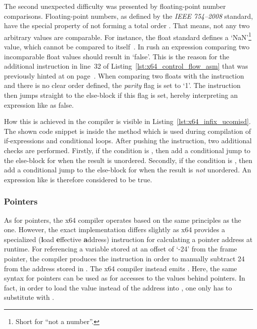 The second unexpected difficulty was presented by floating-point number comparisons.
Floating-point numbers, as defined by the \emph{IEEE 754--2008} standard, have the special property of not forming a total order .
That means, not any two arbitrary values are comparable.
For instance, the float standard defines a `NaN'\footnote{Short for ``not a number''.} value, which cannot be compared to itself~\cite[p.~216]{Patterson2017-zq}.
In rush an expression comparing two incomparable float values should result in `false'.
This is the reason for the additional  instruction in line~32 of Listing~\ref{lst:x64_control_flow_asm} that was previously hinted at on page~\pageref{x64_ucomisd}.
When comparing two floats with the  instruction and there is no clear order defined, the \emph{parity} flag is set to `1'.
The  instruction then jumps straight to the else-block if this flag is set, hereby interpreting an expression like  as false.


How this is achieved in the compiler is visible in Listing~\ref{lst:x64_infix_ucomisd}.
The shown code snippet is inside the  method which is used during compilation of if-expressions and conditional loops.
After pushing the  instruction, two additional checks are performed.
Firstly, if the condition is \qVerb{==}, then add a conditional jump to the else-block for when the result is unordered.
Secondly, if the condition is \qVerb{!=}, then add a conditional jump to the else-block for when the result is \emph{not} unordered.
An expression like  is therefore considered to be true.

\subsubsection{Pointers}

As for pointers, the x64 compiler operates based on the same principles as the \riscv{} one.
However, the exact implementation differs slightly as x64 provides a specialized  (\textbf{l}oad \textbf{e}ffective \textbf{a}ddress) instruction for calculating a pointer address at runtime.
For referencing a variable stored at an offset of `-24' from the frame pointer, the \riscv{} compiler produces the instruction  in order to manually subtract 24 from the address stored in .
The x64 compiler instead emits .
Here, the same syntax for pointers can be used as for accesses to the values behind pointers.
In fact, in order to load the value instead of the address into , one only has to substitute  with .
